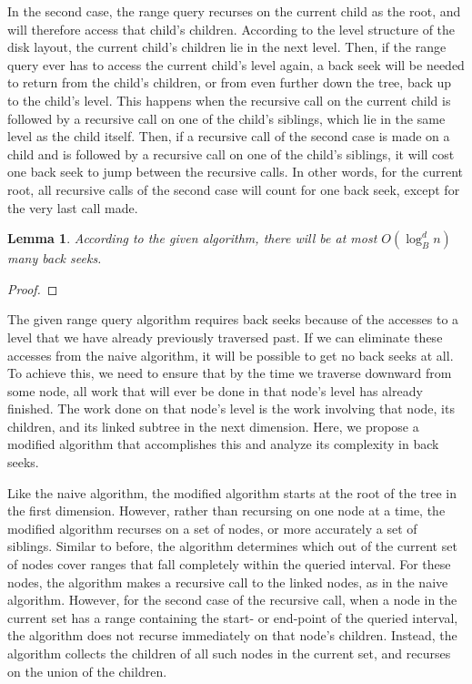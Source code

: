 \documentclass[11pt, oneside]{article}
\newtheorem*{lemma}{Lemma}
\begin{document}
In the second case, the range query recurses on the current child as the root,
and will therefore access that child's children. According to the level
structure of the disk layout, the current child's children lie in the next
level. Then, if the range query ever has to access the current child's level
again, a back seek will be needed to return from the child's children, or from
even further down the tree, back up to the child's level. This happens when the
recursive call on the current child is followed by a recursive call on one of
the child's siblings, which lie in the same level as the child itself. Then, if
a recursive call of the second case is made on a child and is followed by a
recursive call on one of the child's siblings, it will cost one back seek to
jump between the recursive calls. In other words, for the current root, all
recursive calls of the second case will count for one back seek, except for the
very last call made. 

\begin{lemma}
    According to the given algorithm, there will be at most $O(\log_B^dn)$ many
    back seeks.
\end{lemma}
\begin{proof}
\end{proof}

The given range query algorithm requires back seeks because of the accesses to
a level that we have already previously traversed past. If we can eliminate
these accesses from the naive algorithm, it will be possible to get no back
seeks at all. To achieve this, we need to ensure that by the time we traverse
downward from some node, all work that will ever be done in that node's level
has already finished. The work done on that node's level is the work involving
that node, its children, and its linked subtree in the next dimension. Here, we
propose a modified algorithm that accomplishes this and analyze its complexity
in back seeks.

Like the naive algorithm, the modified algorithm starts at the root of the tree
in the first dimension. However, rather than recursing on one node at a time,
the modified algorithm recurses on a set of nodes, or more accurately a set of
siblings. Similar to before, the algorithm determines which out of the current
set of nodes cover ranges that fall completely within the queried interval. For
these nodes, the algorithm makes a recursive call to the linked nodes, as in
the naive algorithm. However, for the second case of the recursive call, when a
node in the current set has a range containing the start- or end-point of the
queried interval, the algorithm does not recurse immediately on that node's
children. Instead, the algorithm collects the children of all such nodes in the
current set, and recurses on the union of the children.
\end{document}

